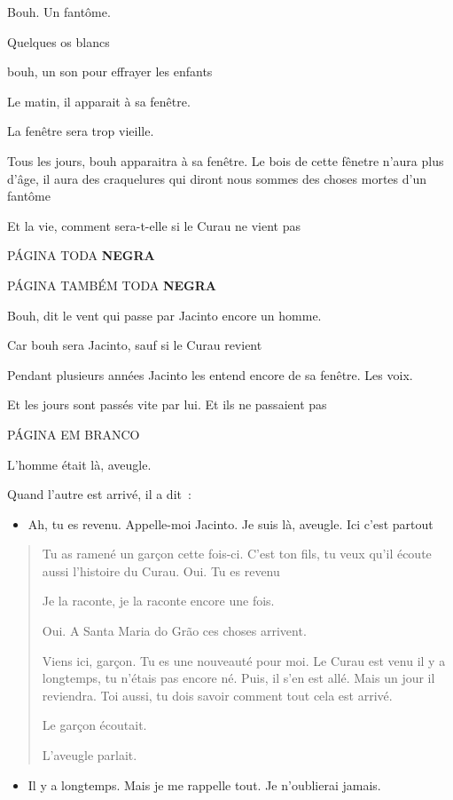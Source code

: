Bouh. Un fantôme.

Quelques os blancs

bouh, un son pour effrayer les enfants

Le matin, il apparait à sa fenêtre.

La fenêtre sera trop vieille.

Tous les jours, bouh apparaitra à sa fenêtre. Le bois de cette fênetre
n'aura plus d'âge, il aura des craquelures qui diront nous sommes des
choses mortes d'un fantôme

Et la vie, comment sera-t-elle si le Curau ne vient pas

PÁGINA TODA \textbf{NEGRA}

PÁGINA TAMBÉM TODA \textbf{NEGRA}

Bouh, dit le vent qui passe par Jacinto encore un homme.

Car bouh sera Jacinto, sauf si le Curau revient

Pendant plusieurs années Jacinto les entend encore de sa fenêtre. Les
voix.

Et les jours sont passés vite par lui. Et ils ne passaient pas

PÁGINA EM BRANCO

L'homme était là, aveugle.

Quand l'autre est arrivé, il a dit~:

\begin{itemize}
\item
  Ah, tu es revenu. Appelle-moi Jacinto. Je suis là, aveugle. Ici c'est
  partout
\end{itemize}

\begin{quote}
Tu as ramené un garçon cette fois-ci. C'est ton fils, tu veux qu'il
écoute aussi l'histoire du Curau. Oui. Tu es revenu

Je la raconte, je la raconte encore une fois.

Oui. A Santa Maria do Grão ces choses arrivent.

Viens ici, garçon. Tu es une nouveauté pour moi. Le Curau est venu il y
a longtemps, tu n'étais pas encore né. Puis, il s'en est allé. Mais un
jour il reviendra. Toi aussi, tu dois savoir comment tout cela est
arrivé.

Le garçon écoutait.

L'aveugle parlait.
\end{quote}

\begin{itemize}
\item
  Il y a longtemps. Mais je me rappelle tout. Je n'oublierai jamais.
\end{itemize}

